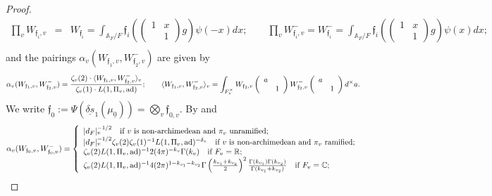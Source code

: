 \documentclass{amsart}
\theoremstyle{definition}
\theoremstyle{remark}
\numberwithin{equation}{section}
\newcommand{\A}{{\mathbb A}}
\newcommand{\C}{{\mathbb C}}
\newcommand{\R}{{\mathbb R}}
\begin{document}
\begin{proof}
\begin{eqnarray*}
    \prod_vW_{\mathfrak{f}_i,v}&=&W_{\mathfrak{f}_i}=\int_{\A_F/F}\mathfrak{f}_i\left(\left(\begin{array}{cc}1&x\\&1\end{array}\right)g\right)\psi(-x)dx;\qquad \prod_vW^-_{\mathfrak{f}_i,v}=W^-_{\mathfrak{f}_i}=\int_{\A_F/F}\mathfrak{f}_i\left(\left(\begin{array}{cc}1&x\\&1\end{array}\right)g\right)\psi(x)dx;\\
\end{eqnarray*}
 and the pairings $\alpha_v(W_{\mathfrak{f}_1,v},W^-_{\mathfrak{f}_2,v})$ are given by
\begin{equation*}\label{calcWhitt}
    \alpha_v(W_{\mathfrak{f}_1,v},W^-_{\mathfrak{f}_2,v})=\frac{\zeta_v(2)\cdot\langle W_{\mathfrak{f}_1,v},W^-_{\mathfrak{f}_2,v} \rangle_v}{\zeta_v(1)\cdot L(1,\Pi_v,{\rm ad})};\qquad \langle W_{\mathfrak{f}_1,v},W^-_{\mathfrak{f}_2,v} \rangle_v=\int_{F_v^\times}W_{\mathfrak{f}_2,v}\left(\begin{array}{cc}a&\\&1\end{array}\right)W^-_{\mathfrak{f}_2,v}\left(\begin{array}{cc}a&\\&1\end{array}\right)d^\times a.
\end{equation*}
We write $\mathfrak{f}_0:=\Psi(\underline{\delta s}_1(\mu_{\underline 0}))=\bigotimes_v\mathfrak{f}_{0,v}$. By \cite[Lemma 3.4]{preprintsanti2} and \cite[Proposition 3.11]{CST}
\begin{eqnarray*}
  \alpha_v(W_{\mathfrak{f}_0,v},W^-_{\mathfrak{f}_0,v})=\left\{\begin{array}{l}
      |d_F|_v^{-1/2}\ \  \text{ if } v\mbox{ is non-archimedean and }\pi_v\mbox{ unramified};  \\
    |d_F|_v^{-1/2}\zeta_v(2)\zeta_v(1)^{-1} L(1,\Pi_v,{\rm ad})^{-\delta_v}\ \  \text{ if } v\mbox{ is non-archimedean and }\pi_v\mbox{ ramified};\\
    \zeta_v(2) L(1,\Pi_v,{\rm ad})^{-1}2(4\pi)^{-k_v}\Gamma(k_v)\ \ \text{ if }F_v=\R;\\
    \zeta_v(2) L(1,\Pi_v,{\rm ad})^{-1}4(2\pi)^{1-k_{v_1}-k_{v_2}}\Gamma\left(\frac{k_{v_1}+k_{v_2}}{2}\right)^2\frac{\Gamma(k_{v_1})\Gamma(k_{v_2})}{\Gamma(k_{v_1}+k_{v_2})}\ \ \text{ if }F_v=\C;
  \end{array}\right. 

\end{eqnarray*}
\end{proof}
\end{document}
